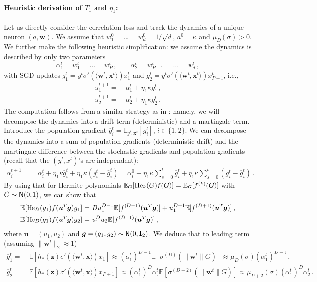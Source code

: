 \documentclass[11pt]{article}
\newcommand{\E}{\mathbb{E}}
\def\id{{\mathbf I}}
\newcommand{\<}{\langle}
\renewcommand{\>}{\rangle}
\theoremstyle{definition}
\def\bg{{\boldsymbol g}}
\def\bu{{\boldsymbol u}}
\def\bw{{\boldsymbol w}}
\def\bx{{\boldsymbol x}}
\def\bz{{\boldsymbol z}}
\def\normal{{\sf N}}
\def\normal{{\sf N}}
\def\normal{{\sf N}}
\def\bz{{\boldsymbol z}}
\def\He{{\rm He}}
\def\bu{{\boldsymbol u}}
\def\bg{{\boldsymbol g}}
\def\bw{{\boldsymbol w}}
\def\bx{{\boldsymbol x}}
\def\bz{{\boldsymbol z}}
\def\He{{\rm He}}
\def\normal{{\sf N}}
\def\bu{{\boldsymbol u}}
\def\bg{{\boldsymbol g}}
\def\bu{{\boldsymbol u}}
\def\bg{{\boldsymbol g}}
\def\og{\overline{g}}
\def\oT{\overline{T}}
\begin{document}
\paragraph*{Heuristic derivation of $\oT_1$ and $\eta_1$:}
Let us directly consider the correlation loss and track the dynamics of a unique neuron $(a,\bw)$. We assume that $w^0_1 = \ldots = w^0_d = 1 /\sqrt{d}$, $a^0 = \kappa$ and $ \mu_D (\sigma) >0$. We further make the following heuristic simplification: we assume the dynamics is described by only two parameters
\[
\alpha_1^t = w_1^t = \ldots = w_P^t \, , \qquad \alpha_2^t = w_{P+1}^t = \ldots = w_d^t \, ,
\]
with SGD updates $g_1^t = y^t \sigma ' ( \< \bw^t , \bx^t \>) x_1^t$ and $g_2^t =  y^t \sigma ' ( \< \bw^t , \bx^t \>) x_{P+1}^t$, i.e.,
\[
\begin{aligned}
    \alpha_1^{t+1} =&~ \alpha_1^t + \eta_1 \kappa g_1^t \, , \\
    \alpha_2^{t+1} =&~ \alpha_2^t + \eta_1 \kappa g_2^t \, .
\end{aligned}
\]
The computation follows from a similar strategy as in \cite{tan2019online,arous2021online}: namely, we will decompose  the dynamics into a drift term (deterministic) and a martingale term.
Introduce the population gradient $\og_i^t = \E_{y^t,\bx^t} [ g_i^t]$, $i \in \{1,2\}$. 
We can decompose the dynamics into a sum of population gradients (deterministic drift) and the martingale difference between the stochastic gradients and population gradients (recall that the $(y^t,x^t)$'s are independent):
\begin{equation}\label{eq:heur_dyn}
\begin{aligned}
    \alpha_i^{t+1} =&~ \alpha_i^t + \eta_1 \kappa \og_i^t +  \eta_1 \kappa (g_i^t - \og_i^t) = \alpha_i^0 + \eta_1 \kappa \sum_{s = 0}^{t} \og_i^t +  \eta_1 \kappa \sum_{s = 0}^{t} (g_i^t - \og_i^t ) \, .
\end{aligned}
\end{equation}
By using that for Hermite polynomials $\E_G [ \He_k (G) f(G)] = \E_G [ f^{(k)}  (G)]$ with $G \sim \normal (0,1)$, we can show that
\[
\begin{aligned}
\E [ \He_D (g_1) f (\bu^T \bg) g_1 ] =&~ D u_1^{D-1}\E [ f^{(D-1)} (\bu^T \bg)] + u_1^{D+1} \E [ f^{(D+1)} (\bu^T \bg)] \, ,\\
\E [ \He_D (g_1) f (\bu^T \bg) g_2 ] =&~  u_1^{D} u_2 \E [ f^{(D+1)} (\bu^T \bg)] \, ,
\end{aligned}
\]
where $\bu = (u_1,u_2)$ and $\bg = (g_1,g_2) \sim \normal (0,\id_2)$. We deduce that to leading term (assuming $\| \bw^t \|_2 \approx 1$)
\[
\begin{aligned}
    \og_1^t =&~ \E [ h_* (\bz) \sigma' (\< \bw^t , \bx \>) x_1] \approx (\alpha_1^t)^{D-1} \E [  \sigma^{(D)} (\| \bw^t \| G)] \approx \mu_D (\sigma) (\alpha_1^t)^{D-1} \, , \\
    \og_2^t = &~ \E [ h_* (\bz) \sigma' (\< \bw^t , \bx \>) x_{P+1}] \approx (\alpha_1^t)^{D} \alpha_2^t \E [  \sigma^{(D+2)} (\| \bw^t \| G)] \approx \mu_{D+2} (\sigma) (\alpha_1^t)^{D} \alpha_2^t\, .
\end{aligned}
\]
\end{document}
